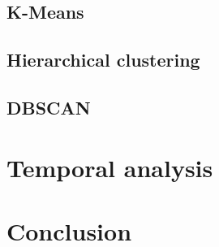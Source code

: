 \documentclass[12pt]{article}
\begin{document}
\subsection{K-Means}

\subsection{Hierarchical clustering}

\subsection{DBSCAN}

\section{Temporal analysis}

\section{Conclusion}





%
\end{document}
